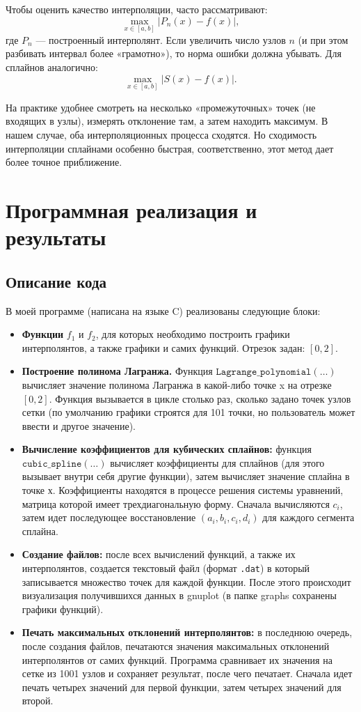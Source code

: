 \documentclass[a4paper, fleqn]{report}
\begin{document}
Чтобы оценить качество интерполяции, часто рассматривают:
\[
\max_{x \in [a, b]} \bigl|P_n(x) - f(x)\bigr|,
\]
где \(P_n\) --- построенный интерполянт. Если увеличить число узлов \(n\) (и при этом разбивать интервал более «грамотно»), то норма ошибки должна убывать. Для сплайнов аналогично:
\[
\max_{x \in [a, b]} |S(x) - f(x)|.
\]

На практике удобнее смотреть на несколько «промежуточных» точек (не входящих в узлы), измерять отклонение там, а затем находить максимум. В нашем случае, оба интерполяционных процесса сходятся. Но сходимость интерполяции сплайнами особенно быстрая, соответственно, этот метод дает более точное приближение.

\chapter{Программная реализация и результаты}

\section*{Описание кода}

В моей программе (написана на языке C) реализованы следующие блоки:
\begin{itemize}
    \item \textbf{Функции} \(f_1\) и \(f_2\), для которых необходимо построить графики интерполянтов, а также графики и самих функций. Отрезок задан: \([0, 2]\).
    \item \textbf{Построение полинома Лагранжа.} Функция \(\texttt{Lagrange\_polynomial}(\dots)\) вычисляет значение полинома Лагранжа в какой-либо точке x на отрезке \([0, 2]\). Функция вызывается в цикле столько раз, сколько задано точек узлов сетки (по умолчанию графики строятся для 101 точки, но пользователь может ввести и другое значение).
    \item \textbf{Вычисление коэффициентов для кубических сплайнов:} функция \(\texttt{cubic\_spline}(\dots)\) вычисляет коэффициенты для сплайнов (для этого вызывает внутри себя другие функции), затем вычисляет значение сплайна в точке х. Коэффициенты находятся в процессе решения системы уравнений, матрица которой имеет трехдиагональную форму. Сначала вычисляются \(c_i\), затем идет последующее восстановление \((a_i, b_i, c_i, d_i)\) для каждого сегмента сплайна.
    \item \textbf{Создание файлов:} после всех вычислений функций, а также их интерполянтов, создается текстовый файл (формат \texttt{.dat}) в который записывается множество точек для каждой функции. После этого происходит визуализация получившихся данных в gnuplot (в папке graphs сохранены графики функций).
    \item \textbf{Печать максимальных отклонений интерполянтов:} в последнюю очередь, после создания файлов, печатаются значения максимальных отклонений интерполянтов от самих функций. Программа сравнивает их значения на сетке из 1001 узлов и сохраняет результат, после чего печатает. Сначала идет печать четырех значений для первой функции, затем четырех значений для второй.
\end{itemize}
\end{document}
